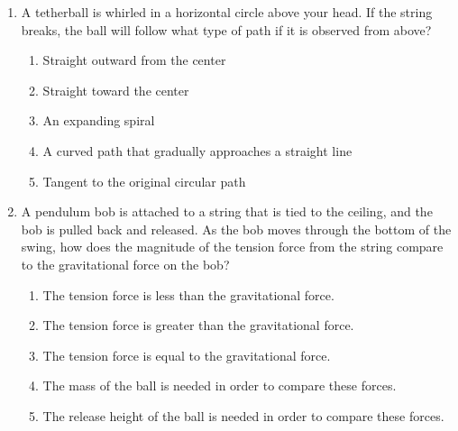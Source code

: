 \documentclass{../../../oss-classkick}
\begin{document}
\begin{multicols}{2}
\begin{enumerate}[leftmargin=18pt]
  \item A tetherball is whirled in a horizontal circle above your head. If the
    string breaks, the ball will follow what type of path if it is observed
    from above?
    \begin{enumerate}[nosep,leftmargin=18pt,label=(\Alph*)]
    \item Straight outward from the center
    \item Straight toward the center
    \item An expanding spiral
    \item A curved path that gradually approaches a straight line
    \item Tangent to the original circular path
    \end{enumerate}
    \vspace{.7in}
    
  \item A pendulum bob is attached to a string that is tied to the ceiling, and
    the bob is pulled back and released. As the bob moves through the bottom of
    the swing, how does the magnitude of the tension force from the string
    compare to the gravitational force on the bob?
    \begin{enumerate}[nosep,leftmargin=18pt,label=(\Alph*)]
    \item The tension force is less than the gravitational force.
    \item The tension force is greater than the gravitational force.
    \item The tension force is equal to the gravitational force.
    \item The mass of the ball is needed in order to compare these forces.
    \item The release height of the ball is needed in order to compare these
      forces.
    \end{enumerate}
    \vspace{.7in}
    \columnbreak
    

\end{enumerate}
\end{multicols}
\end{document}
